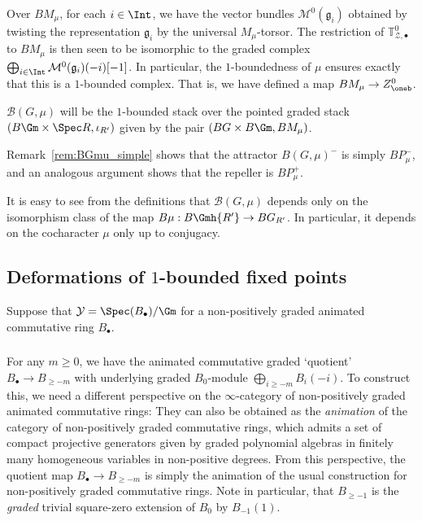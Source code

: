 \documentclass[10pt]{amsart}
\begin{document}
Over $BM_\mu$, for each $i\in \Int$, we have the vector bundles $\mathcal{M}^0(\mathfrak{g}_i)$ obtained by twisting the representation $\mathfrak{g}_i$ by the universal $M_\mu$-torsor. The restriction of $\mathbb{T}^0_{\mathcal{Z},\bullet}$ to $BM_\mu$ is then seen to be isomorphic to the graded complex $\bigoplus_{i\in\Int}\mathcal{M}^0(\mathfrak{g}_i)(-i)[-1]$. In particular, the $1$-boundedness of $\mu$ ensures exactly that this is a $1$-bounded complex. That is, we have defined a map $BM_\mu\to Z^0_{\oneb}$. 


\begin{definition}
\label{defn:BGmu_1-bounded_stack}
$\mathcal{B}(G,\mu)$ will be the $1$-bounded stack over the pointed graded stack $(B\Gm\times\Spec R,\iota_{R'})$ given by the pair $(BG\times B\Gm,BM_\mu)$.

Remark~\ref{rem:BGmu_simple} shows that the attractor $B(G,\mu)^-$ is simply $BP^-_\mu$, and an analogous argument shows that the repeller is $BP^+_\mu$.
\end{definition}

\begin{remark}
\label{rem:independence_of_mu}
It is easy to see from the definitions that $\mathcal{B}(G,\mu)$ depends only on the isomorphism class of the map $B\mu:B\Gmh{R'}\to BG_{R'}$. In particular, it depends on the cocharacter $\mu$ only up to conjugacy. 
\end{remark}  


\subsection{Deformations of $1$-bounded fixed points}
\label{subsec:deform_1bounded_fixed_pts}
Suppose that $\mathcal{Y} = \Spec(B_\bullet)/\Gm$ for a non-positively graded animated commutative ring $B_\bullet$.

\subsubsection{}
For any $m\ge 0$, we have the animated commutative graded `quotient' $B_\bullet\to B_{\ge -m}$ with underlying graded $B_0$-module $\bigoplus_{i\ge -m}B_i(-i)$. To construct this, we need a different perspective on the $\infty$-category of non-positively graded animated commutative rings: They can also be obtained as the \emph{animation} of the category of non-positively graded commutative rings, which admits a set of compact projective generators given by graded polynomial algebras in finitely many homogeneous variables in non-positive degrees. From this perspective, the quotient map $B_\bullet\to B_{\ge -m}$ is simply the animation of the usual construction for non-positively graded commutative rings. Note in particular, that $B_{\ge -1}$ is the \emph{graded} trivial square-zero extension of $B_0$ by $B_{-1}(1)$. 
 
\end{document}
